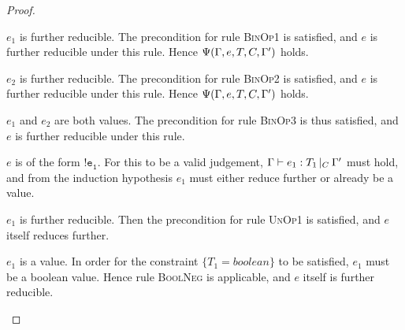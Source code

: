 \documentclass[a4paper]{article}
\theoremstyle{dotless}
\begin{document}
\begin{proof}
\begin{case}
  	\begin{subcase}
  	  $e_1$ is further reducible. The precondition for rule \textsc{BinOp1} is
  	  satisfied, and $e$ is further reducible under this rule. Hence
  	  $\Psi(\Gamma, e, T, C, \Gamma')$ holds.
 	\end{subcase}

  	\begin{subcase}
  	  $e_2$ is further reducible. The precondition for rule \textsc{BinOp2} is
  	  satisfied, and $e$ is further reducible under this rule. Hence
  	  $\Psi(\Gamma, e, T, C, \Gamma')$ holds.
 	\end{subcase}

	\begin{subcase}
	  $e_1$ and $e_2$ are both values. 
	  The precondition for rule \textsc{BinOp3} is thus satisfied, and $e$ is
	  further reducible under this rule.
	\end{subcase}
  \end{case}

  \begin{case}[NegType]\label{negtype}
	$e$ is of the form $\mathtt{!e_1}$. For this to be a valid judgement,
	$\Gamma{}\vdash e_1: T_1\,|_C\:\Gamma'$ must hold, and from the induction hypothesis $e_1$ must
	either reduce further or already be a value.

	\begin{subcase}
	  $e_1$ is further reducible. Then the precondition for rule \textsc{UnOp1}
	  is satisfied, and $e$ itself reduces further.
	\end{subcase}

	\begin{subcase}
	  $e_1$ is a value. In order for the constraint $\{T_1=boolean\}$ to be
	  satisfied, $e_1$ must be a boolean value. Hence 
	  rule \textsc{BoolNeg} is applicable, and $e$ itself is further reducible.
	\end{subcase}
  \end{case}


\end{proof}
\end{document}
